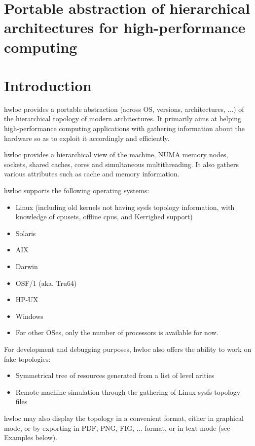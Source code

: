 \section*{Portable abstraction of hierarchical architectures for high-performance computing}





 \hypertarget{index_Introduction}{}\section{Introduction}\label{index_Introduction}
hwloc provides a portable abstraction (across OS, versions, architectures, ...) of the hierarchical topology of modern architectures. It primarily aims at helping high-performance computing applications with gathering information about the hardware so as to exploit it accordingly and efficiently.

hwloc provides a hierarchical view of the machine, NUMA memory nodes, sockets, shared caches, cores and simultaneous multithreading. It also gathers various attributes such as cache and memory information.

hwloc supports the following operating systems:

\begin{itemize}
\item Linux (including old kernels not having sysfs topology information, with knowledge of cpusets, offline cpus, and Kerrighed support) \item Solaris \item AIX \item Darwin \item OSF/1 (aka. Tru64) \item HP-UX \item Windows \item For other OSes, only the number of processors is available for now. \end{itemize}


For development and debugging purposes, hwloc also offers the ability to work on fake topologies:

\begin{itemize}
\item Symmetrical tree of resources generated from a list of level arities \item Remote machine simulation through the gathering of Linux sysfs topology files \end{itemize}


hwloc may also display the topology in a convenient format, either in graphical mode, or by exporting in PDF, PNG, FIG, ... format, or in text mode (see Examples below).

